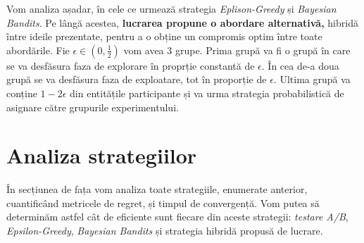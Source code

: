 Vom analiza așadar, în cele ce urmează strategia \textit{Eplison-Greedy} și \textit{Bayesian Bandits}. Pe lângă acestea, \textbf{lucrarea propune o abordare alternativă,} hibridă între ideile prezentate, pentru a o obține un compromis optim între toate abordările. Fie $\epsilon \in(0, \frac{1}{2})$ vom avea 3 grupe. Prima grupă va fi o grupă în care se va desfăsura faza de explorare în proprție constantă de $\epsilon$. În cea de-a doua grupă se va desfăsura faza de exploatare, tot în proporție de $\epsilon$. Ultima grupă va conține $1 - 2\epsilon$ din entitățile participante și va urma strategia probabilistică de asignare către grupurile experimentului.

\section{Analiza strategiilor}

În secțiunea de fața vom analiza toate strategiile, enumerate anterior, cuantificând metricele de regret, și timpul de convergență. Vom putea să determinăm astfel cât de eficiente sunt fiecare din aceste strategii: \textit{testare A/B}, \textit{Epsilon-Greedy}, \textit{Bayesian Bandits} și strategia hibridă propusă de lucrare. 

